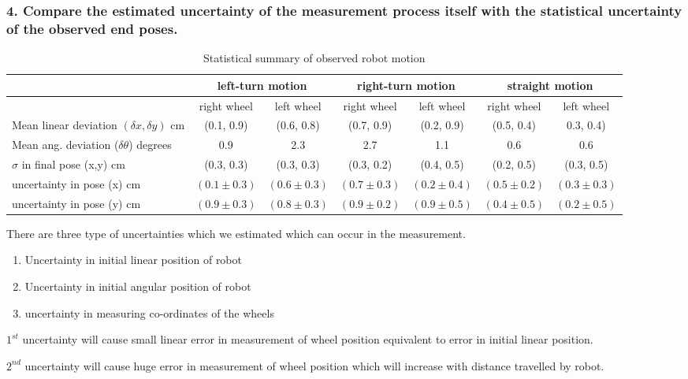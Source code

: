 \newpage
\subsubsection*{4. Compare the estimated uncertainty of the measurement process itself with the statistical uncertainty of the observed end poses.}

\begin{table}[H]
	\centering
	\begin{tabular}{| l | c | c | c | c | c | c |}
		\hline
		& \multicolumn{2}{c|}{left-turn motion} & \multicolumn{2}{c|}{ right-turn motion} & \multicolumn{2}{c|}{straight motion} \\
		\hline
		& right wheel & left wheel & right wheel & left wheel & right wheel & left wheel \\
		\hline
		Mean linear deviation $(\delta x, \delta y)$ cm & (0.1, 0.9) & (0.6, 0.8)
		& (0.7, 0.9) & (0.2, 0.9) & (0.5, 0.4) & 0.3, 0.4) \\
		\hline
		Mean ang. deviation ($\delta \theta$) degrees & 0.9 & 2.3 & 2.7 & 1.1 & 0.6 & 0.6 \\
		\hline
		$\sigma$ in final pose (x,y) cm & (0.3, 0.3) & (0.3, 0.3) & (0.3, 0.2) & (0.4, 0.5) & (0.2, 0.5) & (0.3, 0.5)\\
		\hline
		uncertainty in pose (x) cm & $(0.1 \pm 0.3)$ & $(0.6 \pm 0.3)$ & $(0.7 \pm 0.3)$ & $(0.2 \pm 0.4)$ & $(0.5 \pm 0.2)$ & $(0.3 \pm 0.3)$ \\
		uncertainty in pose (y) cm & $(0.9 \pm 0.3)$ & $(0.8 \pm 0.3)$ & $(0.9 \pm 0.2)$ & $(0.9 \pm 0.5)$ & $(0.4 \pm 0.5)$ & $(0.2 \pm 0.5)$ \\
		\hline
	\end{tabular}
	\caption{Statistical summary of observed robot motion}
	\label{stats}
\end{table}
There are three type of uncertainties which we estimated which can occur in the measurement. 
\begin{enumerate}
	\item Uncertainty in initial linear position of robot
	\item Uncertainty in initial angular position of robot
	\item uncertainty in measuring co-ordinates of the wheels
\end{enumerate}   

$1^{st}$ uncertainty will cause small linear error in measurement of wheel position equivalent to error in initial linear position.

$2^{nd}$ uncertainty will cause huge error in measurement of wheel position which will increase with distance travelled by robot. 

